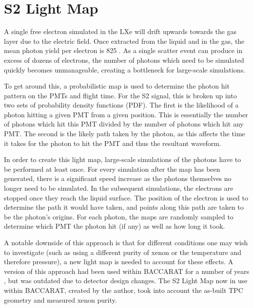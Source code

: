 \section{S2 Light Map}
\label{sec:s2lightmap}
\par
A single free electron simulated in the LXe will drift upwards towards the gas layer due to the electric field.
Once extracted from the liquid and in the gas, the mean photon yield per electron is 825 \cite{NoPhotonsPerElectron}.
As a single scatter event can produce in excess of dozens of electrons, the number of photons which need to be simulated quickly becomes unmanageable, creating a bottleneck for large-scale simulations.
\par
To get around this, a probabilistic map is used to determine the photon hit pattern on the PMTs and flight time.
For the S2 signal, this is broken up into two sets of probability density functions (PDF).
The first is the likelihood of a photon hitting a given PMT from a given position.
This is essentially the number of photons which hit this PMT divided by the number of photons which hit any PMT.
The second is the likely path taken by the photon, as this affects the time it takes for the photon to hit the PMT and thus the resultant waveform.
\par
In order to create this light map, large-scale simulations of the photons have to be performed at least once.
For every simulation after the map has been generated, there is a significant speed increase as the photons themselves no longer need to be simulated.
In the subsequent simulations, the electrons are stopped once they reach the liquid surface.
The position of the electron is used to determine the path it would have taken, and points along this path are taken to be the photon's origins. %
For each photon, the maps are randomly sampled to determine which PMT the photon hit (if any) as well as how long it took.

\par
A notable downside of this approach is that for different conditions one may wish to investigate (such as using a different purity of xenon or the temperature and therefore pressure), a new light map is needed to account for these effects.
A version of this approach had been used within BACCARAT for a number of years \cite{lz_simulations_ref}, but was outdated due to detector design changes.
The S2 Light Map now in use within BACCARAT, created by the author, took into account the as-built TPC geometry and measured xenon purity.

